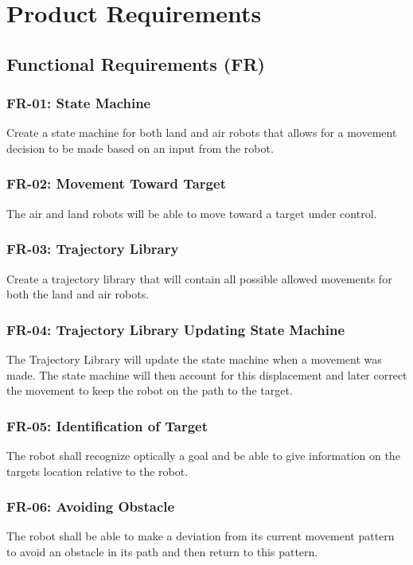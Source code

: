 \documentclass[]{report}
\begin{document}
\chapter{Product Requirements}

\section{Functional Requirements (FR)}

\subsection{FR-01: State Machine}
Create a state machine for both land and air robots that allows for a movement decision to be made based on an input from the robot. 

\subsection{FR-02: Movement Toward Target}
The air and land robots will be able to move toward a target under control.

\subsection{FR-03: Trajectory Library}
Create a trajectory library that will contain all possible allowed movements for both the land and air robots.

\subsection{FR-04: Trajectory Library Updating State Machine}
The Trajectory Library will update the state machine when a movement was made. The state machine will then account for this displacement and later correct the movement to keep the robot on the path to the target.

\subsection{FR-05: Identification of Target}
The robot shall recognize optically a goal and be able to give information on the targets location relative to the robot. 

\subsection{FR-06: Avoiding Obstacle}
The robot shall be able to make a deviation from its current movement pattern to avoid an obstacle in its path and then return to this pattern.
\end{document}
